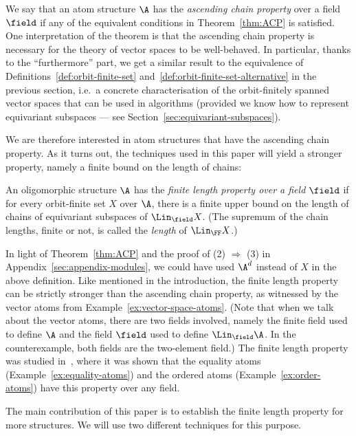 We say that an atom structure $\A$ has the \emph{ascending chain property} over a field $\field$ if any of the equivalent conditions in Theorem~\ref{thm:ACP} is satisfied. 
One interpretation of the theorem is that the ascending chain property is necessary for the theory of vector spaces to be well-behaved. 
In particular, thanks to the ``furthermore'' part, we get a similar result to the equivalence of Definitions~\ref{def:orbit-finite-set} and~\ref{def:orbit-finite-set-alternative} in the previous section, 
i.e.~a concrete characterisation of the orbit-finitely spanned vector spaces that can be used in algorithms (provided we know how to represent equivariant subspaces --- see Section~\ref{sec:equivariant-subspaces}). 


We are therefore interested in atom structures that have the ascending chain property. 
As it turns out, the techniques used in this paper will yield a stronger property, namely a finite bound on the length of chains: 




\begin{definition}
    \label{def:finite-length-property}
    An oligomorphic structure $\A$ has the \emph{finite length property over a field $\field$} if for every orbit-finite set $X$ over $\A$, there is a finite upper bound on the length of chains of equivariant subspaces 
    of $\Lin_\field X$.
    (The supremum of the chain lengths, finite or not, is called the \emph{length} of $\Lin_\FF X$.)
\end{definition}

In light of Theorem~\ref{thm:ACP} and the proof of (2) $\Rightarrow$ (3) in Appendix~\ref{sec:appendix-modules}, we could have used $\A^d$ instead of $X$ in the above definition.
Like mentioned in the introduction, the finite length property can be strictly stronger than the ascending chain property, as witnessed by the vector atoms from Example~\ref{ex:vector-space-atoms}. 
(Note that when we talk about the vector atoms, there are two fields involved, namely the finite field used to define $\A$ and the field $\field$ used to define $\Lin_\field \A$. 
In the counterexample, both fields are the two-element field.)
The finite length property was studied in~\cite{BFKM24}, where it was shown that the equality atoms (Example~\ref{ex:equality-atoms}) and the ordered atoms (Example~\ref{ex:order-atoms}) have this property over any field. 

The main contribution of this paper is to establish the finite length property for more structures. 
We will use two different techniques for this purpose.
